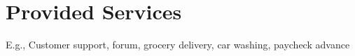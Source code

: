 \section{Provided Services}

E.g., Customer support, forum, grocery delivery, car washing, paycheck advance

\pagebreak 